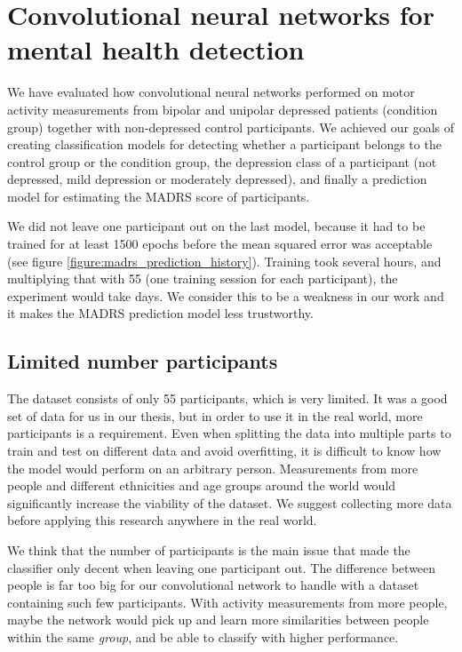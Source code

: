 \section{Convolutional neural networks for mental health detection}
We have evaluated how convolutional neural networks performed on motor activity measurements from bipolar and unipolar depressed patients (condition group) together with non-depressed control participants. We achieved our goals of creating classification models for detecting whether a participant belongs to the control group or the condition group, the depression class of a participant (not depressed, mild depression or moderately depressed), and finally a prediction model for estimating the MADRS score of participants. 

We did not leave one participant out on the last model, because it had to be trained for at least 1500 epochs before the mean squared error was acceptable (see figure \ref{figure:madrs_prediction_history}). Training took several hours, and multiplying that with 55 (one training session for each participant), the experiment would take days. We consider this to be a weakness in our work and it makes the MADRS prediction model less trustworthy. 

\subsection{Limited number participants}
The dataset consists of only 55 participants, which is very limited. It was a good set of data for us in our thesis, but in order to use it in the real world, more participants is a requirement. Even when splitting the data into multiple parts to train and test on different data and avoid overfitting, it is difficult to know how the model would perform on an arbitrary person. Measurements from more people and different ethnicities and age groups around the world would significantly increase the viability of the dataset. We suggest collecting more data before applying this research anywhere in the real world.
 
We think that the number of participants is the main issue that made the classifier only decent when leaving one participant out. The difference between people is far too big for our convolutional network to handle with a dataset containing such few participants. With activity measurements from more people, maybe the network would pick up and learn more similarities between people within the same \textit{group}, and be able to classify with higher performance. 

